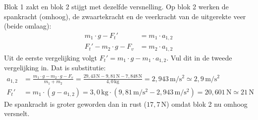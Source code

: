 \documentclass{ximera}
\begin{document}
\begin{exercise}
\begin{question}
\begin{solution}
            Blok 1 zakt en blok 2 stijgt met dezelfde versnelling. Op blok 2 werken de spankracht (omhoog), de zwaartekracht en de veerkracht van de uitgerekte veer (beide omlaag):
            \begin{align*}
                m_{1} \cdot g - F_{t}' &= m_{1} \cdot a_{1,2} \\
                F_{t}' - m_{2} \cdot g - F_{v} &= m_{2} \cdot a_{1,2}
            \end{align*}
            Uit de eerste vergelijking volgt $F_{t}' = m_{1} \cdot g - m_{1} \cdot a_{1,2}$. Vul dit in de tweede vergelijking in. Dat is substitutie:
            \begin{align*}
                a_{1,2} &= \frac{m_{1} \cdot g - m_{2} \cdot g - F_{v}}{m_{1}+m_{2}} = \frac{29{,}43 \, \mathrm{N} - 9{,}81 \, \mathrm{N} - 7{,}848 \, \mathrm{N}}{4{,}0 \, \mathrm{kg}} = 2{,}943 \, \mathrm{m/s^2} \simeq 2{,}9 \, \mathrm{m/s^2} \\
                F_{t}' &= m_{1} \cdot (g - a_{1,2}) = 3{,}0 \, \mathrm{kg} \cdot (9{,}81 \, \mathrm{m/s^2} - 2{,}943 \, \mathrm{m/s^2}) = 20{,}601 \, \mathrm{N} \simeq 21 \, \mathrm{N}
            \end{align*}
            De spankracht is groter geworden dan in rust ($17{,}7 \, \mathrm{N}$) omdat blok 2 nu omhoog versnelt.
        \end{solution}
    \end{question}
\end{exercise}
\end{document}
